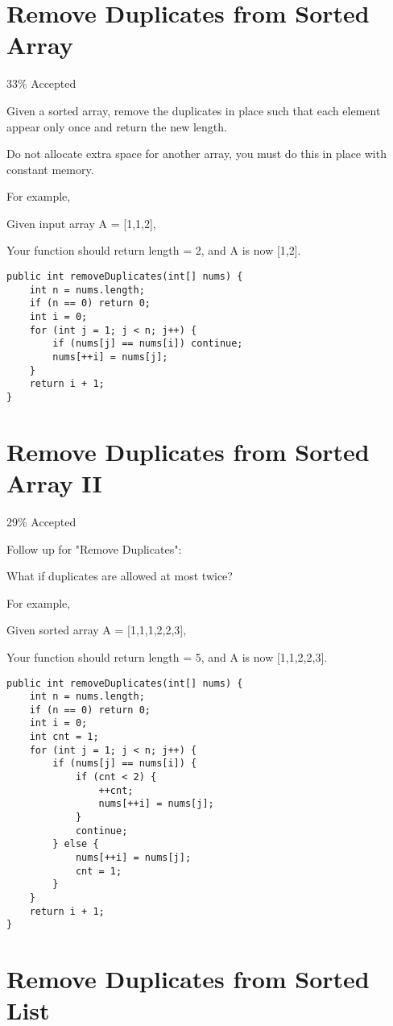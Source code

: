 \documentclass[12pt]{book}
\begin{document}
\chapter{Remove Duplicates from Sorted Array}
\label{sec-52}

33\% Accepted

Given a sorted array, remove the duplicates in place such that each element appear only once and return the new length.

Do not allocate extra space for another array, you must do this in place with constant memory.

For example,

Given input array A = [1,1,2],

Your function should return length = 2, and A is now [1,2].
\lstset{language=java,label= ,caption= ,numbers=none}
\begin{lstlisting}
public int removeDuplicates(int[] nums) {
    int n = nums.length;
    if (n == 0) return 0;
    int i = 0;
    for (int j = 1; j < n; j++) {
        if (nums[j] == nums[i]) continue;
        nums[++i] = nums[j];
    }
    return i + 1;
}
\end{lstlisting}
\chapter{Remove Duplicates from Sorted Array II}
\label{sec-53}

29\% Accepted

Follow up for "Remove Duplicates":

What if duplicates are allowed at most twice?

For example,

Given sorted array A = [1,1,1,2,2,3],

Your function should return length = 5, and A is now [1,1,2,2,3].
\lstset{language=java,label= ,caption= ,numbers=none}
\begin{lstlisting}
public int removeDuplicates(int[] nums) {
    int n = nums.length;
    if (n == 0) return 0;
    int i = 0;
    int cnt = 1;
    for (int j = 1; j < n; j++) {
        if (nums[j] == nums[i]) {
            if (cnt < 2) {
                ++cnt;
                nums[++i] = nums[j];
            } 
            continue;   
        } else {
            nums[++i] = nums[j];
            cnt = 1;
        }
    }
    return i + 1;
}
\end{lstlisting}
\chapter{Remove Duplicates from Sorted List}
\label{sec-54}
\end{document}
